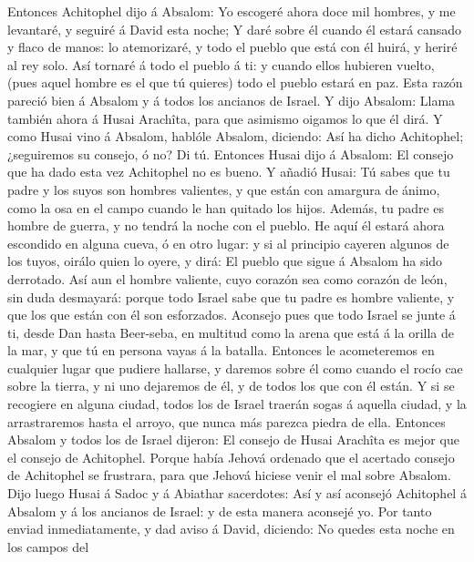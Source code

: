  Entonces Achitophel dijo á Absalom: Yo escogeré ahora
doce mil hombres, y me levantaré, y seguiré á David esta noche;
 Y daré sobre él cuando él estará cansado y flaco de
manos: lo atemorizaré, y todo el pueblo que está con él huirá, y heriré
al rey solo.  Así tornaré á todo el pueblo á ti: y cuando
ellos hubieren vuelto, (pues aquel hombre es el que tú quieres) todo el
pueblo estará en paz.  Esta razón pareció bien á Absalom y
á todos los ancianos de Israel.  Y dijo Absalom: Llama
también ahora á Husai Arachîta, para que asimismo oigamos lo que él
dirá.  Y como Husai vino á Absalom, hablóle Absalom,
diciendo: Así ha dicho Achitophel; ¿seguiremos su consejo, ó no? Di tú.
 Entonces Husai dijo á Absalom: El consejo que ha dado
esta vez Achitophel no es bueno.  Y añadió Husai: Tú sabes
que tu padre y los suyos son hombres valientes, y que están con amargura
de ánimo, como la osa en el campo cuando le han quitado los hijos.
Además, tu padre es hombre de guerra, y no tendrá la noche con el
pueblo.  He aquí él estará ahora escondido en alguna
cueva, ó en otro lugar: y si al principio cayeren algunos de los tuyos,
oirálo quien lo oyere, y dirá: El pueblo que sigue á Absalom ha sido
derrotado.  Así aun el hombre valiente, cuyo corazón sea
como corazón de león, sin duda desmayará: porque todo Israel sabe que tu
padre es hombre valiente, y que los que están con él son esforzados.
 Aconsejo pues que todo Israel se junte á ti, desde Dan
hasta Beer-seba, en multitud como la arena que está á la orilla de la
mar, y que tú en persona vayas á la batalla.  Entonces le
acometeremos en cualquier lugar que pudiere hallarse, y daremos sobre él
como cuando el rocío cae sobre la tierra, y ni uno dejaremos de él, y de
todos los que con él están.  Y si se recogiere en alguna
ciudad, todos los de Israel traerán sogas á aquella ciudad, y la
arrastraremos hasta el arroyo, que nunca más parezca piedra de ella.
 Entonces Absalom y todos los de Israel dijeron: El
consejo de Husai Arachîta es mejor que el consejo de Achitophel. Porque
había Jehová ordenado que el acertado consejo de Achitophel se
frustrara, para que Jehová hiciese venir el mal sobre Absalom.
 Dijo luego Husai á Sadoc y á Abiathar sacerdotes: Así y
así aconsejó Achitophel á Absalom y á los ancianos de Israel: y de esta
manera aconsejé yo.  Por tanto enviad inmediatamente, y
dad aviso á David, diciendo: No quedes esta noche en los campos del
